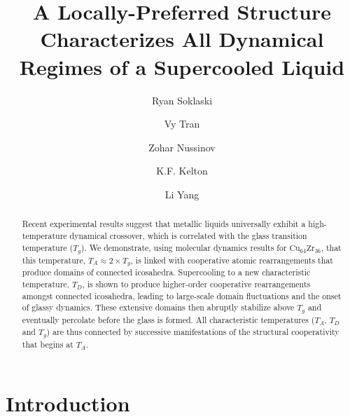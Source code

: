 \documentclass[aps,prl,preprint,showpacs,amsmath,floatfix,superscriptaddress]{revtex4}
\begin{document}
\title{A Locally-Preferred Structure Characterizes All Dynamical Regimes of a Supercooled Liquid}

\author{Ryan Soklaski}
\author{Vy Tran}
\author{Zohar Nussinov}
\author{K.F. Kelton}
\author{Li Yang}
\date{}

\begin{abstract}
Recent experimental results suggest that metallic liquids
universally exhibit a high-temperature dynamical crossover, which
is correlated with the glass transition temperature ($T_{g}$). We
demonstrate, using molecular dynamics results for
$\mathrm{Cu_{64}Zr_{36}}$, that this temperature, $T_{A} \approx 2
\times T_{g}$, is linked with cooperative atomic rearrangements
that produce domains of connected icosahedra. Supercooling to a
new characteristic temperature, $T_{D}$, is shown to produce
higher-order cooperative rearrangements amongst connected
icosahedra, leading to large-scale domain fluctuations and the
onset of glassy dynamics. These extensive domains then abruptly
stabilize above $T_{g}$ and eventually percolate before the glass
is formed. All characteristic temperatures ($T_{A}$, $T_{D}$ and
$T_{g}$) are thus connected by successive manifestations of the
structural cooperativity that begins at $T_{A}$.
\end{abstract}

\maketitle

\section{Introduction}
\end{document}
